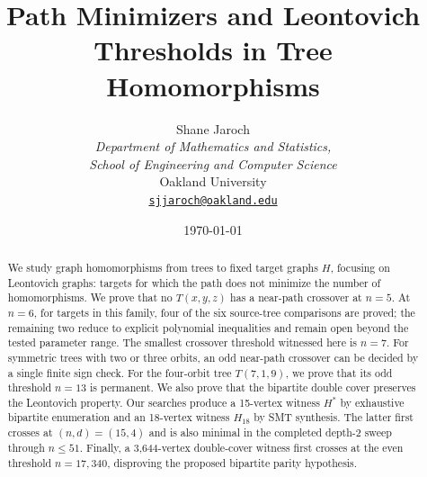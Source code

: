 \documentclass[11pt, letterpaper]{article}
\title{%
  \textbf{Path Minimizers and Leontovich Thresholds in Tree Homomorphisms}\\[0.5em]
}
\author{%
  Shane Jaroch \\
  \small \textit{Department of Mathematics and Statistics,} \\
  \small \textit{School of Engineering and Computer Science} \\
  \small Oakland University \\
  \small \href{mailto:sjjaroch@oakland.edu}{\texttt{sjjaroch@oakland.edu}}
}
\date{\today}
\theoremstyle{definition}
\theoremstyle{remark}
\begin{document}
\maketitle

\begin{abstract}
We study graph homomorphisms from trees to fixed target graphs $H$, focusing
on Leontovich graphs: targets for which the path does not minimize the number
of homomorphisms. We prove that no $T(x,y,z)$ has a near-path crossover at
$n=5$. At $n=6$, for targets in this family, four of the six source-tree
comparisons are proved; the remaining two reduce to explicit polynomial
inequalities and remain open beyond the tested parameter range. The smallest
crossover threshold witnessed here is $n=7$. For symmetric trees with two or
three orbits, an odd near-path crossover can be decided by a single finite
sign check. For the four-orbit tree $T(7,1,9)$, we prove that its odd threshold
$n=13$ is permanent. We also prove that the bipartite double cover preserves
the Leontovich property. Our searches produce a 15-vertex witness $H^*$ by
exhaustive bipartite enumeration and an 18-vertex witness $H_{18}$ by SMT
synthesis. The latter first crosses at $(n,d)=(15,4)$ and is also minimal in
the completed depth-2 sweep through $n \le 51$. Finally, a
3,644-vertex double-cover witness first crosses at the even threshold
$n=17{,}340$, disproving the proposed bipartite parity hypothesis.
\end{abstract}












\appendix




\end{document}
